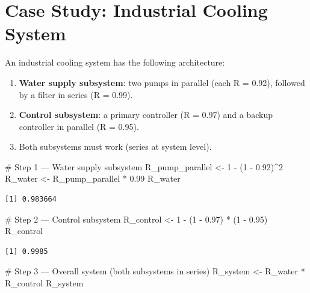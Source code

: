 \documentclass[
  letterpaper,
  DIV=11,
  numbers=noendperiod]{scrreprt}
\newenvironment{Shaded}{\begin{snugshade}}{\end{snugshade}}
\newcommand{\CommentTok}[1]{\textcolor[rgb]{0.37,0.37,0.37}{#1}}
\newcommand{\DecValTok}[1]{\textcolor[rgb]{0.68,0.00,0.00}{#1}}
\newcommand{\FloatTok}[1]{\textcolor[rgb]{0.68,0.00,0.00}{#1}}
\newcommand{\NormalTok}[1]{\textcolor[rgb]{0.00,0.23,0.31}{#1}}
\newcommand{\OtherTok}[1]{\textcolor[rgb]{0.00,0.23,0.31}{#1}}
\newcommand{\SpecialCharTok}[1]{\textcolor[rgb]{0.37,0.37,0.37}{#1}}
\providecommand{\tightlist}{%
  \setlength{\itemsep}{0pt}\setlength{\parskip}{0pt}}
\begin{document}
\section{Case Study: Industrial Cooling
System}\label{case-study-industrial-cooling-system}

An industrial cooling system has the following architecture:

\begin{enumerate}
\def\labelenumi{\arabic{enumi}.}
\tightlist
\item
  \textbf{Water supply subsystem}: two pumps in parallel (each R =
  0.92), followed by a filter in series (R = 0.99).
\item
  \textbf{Control subsystem}: a primary controller (R = 0.97) and a
  backup controller in parallel (R = 0.95).
\item
  Both subsystems must work (series at system level).
\end{enumerate}

\begin{Shaded}
\begin{Highlighting}[]
\CommentTok{\# Step 1 — Water supply subsystem}
\NormalTok{R\_pump\_parallel }\OtherTok{\textless{}{-}} \DecValTok{1} \SpecialCharTok{{-}}\NormalTok{ (}\DecValTok{1} \SpecialCharTok{{-}} \FloatTok{0.92}\NormalTok{)}\SpecialCharTok{\^{}}\DecValTok{2}
\NormalTok{R\_water }\OtherTok{\textless{}{-}}\NormalTok{ R\_pump\_parallel }\SpecialCharTok{*} \FloatTok{0.99}
\NormalTok{R\_water}
\end{Highlighting}
\end{Shaded}

\begin{verbatim}
[1] 0.983664
\end{verbatim}

\begin{Shaded}
\begin{Highlighting}[]
\CommentTok{\# Step 2 — Control subsystem}
\NormalTok{R\_control }\OtherTok{\textless{}{-}} \DecValTok{1} \SpecialCharTok{{-}}\NormalTok{ (}\DecValTok{1} \SpecialCharTok{{-}} \FloatTok{0.97}\NormalTok{) }\SpecialCharTok{*}\NormalTok{ (}\DecValTok{1} \SpecialCharTok{{-}} \FloatTok{0.95}\NormalTok{)}
\NormalTok{R\_control}
\end{Highlighting}
\end{Shaded}

\begin{verbatim}
[1] 0.9985
\end{verbatim}

\begin{Shaded}
\begin{Highlighting}[]
\CommentTok{\# Step 3 — Overall system (both subsystems in series)}
\NormalTok{R\_system }\OtherTok{\textless{}{-}}\NormalTok{ R\_water }\SpecialCharTok{*}\NormalTok{ R\_control}
\NormalTok{R\_system}
\end{Highlighting}
\end{Shaded}
\end{document}

